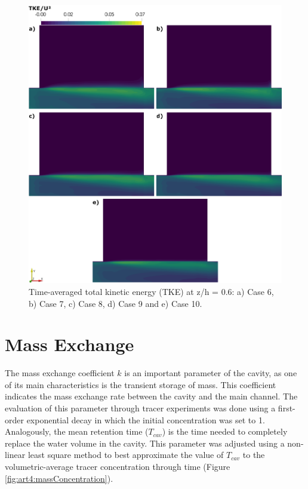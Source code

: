 \begin{figure}[!ht]
\centering
\includegraphics[width=\linewidth]{../images/art4/totalTKEMean2.jpeg}
\caption{Time-averaged total kinetic energy (TKE) at z/h = 0.6: a) Case 6, b) Case 7, c) Case 8, d) Case 9 and e) Case 10.}
\label{fig:art4:totalTKEMean2}
\end{figure}

\section{Mass Exchange}
The mass exchange coefficient $k$ is an important parameter of the cavity, as one of its main characteristics is the transient storage of mass. This coefficient indicates the mass exchange rate between the cavity and the main channel. The evaluation of this parameter through tracer experiments was done using a first-order exponential decay in which the initial concentration was set to 1. Analogously, the mean retention time ($T_{cav}$) is the time needed to completely replace the water volume in the cavity. This parameter was adjusted using a non-linear least square method to best approximate the value of $T_{cav}$ to the volumetric-average tracer concentration through time \cite{weitbrecht2004} (Figure \ref{fig:art4:massConcentration}).

